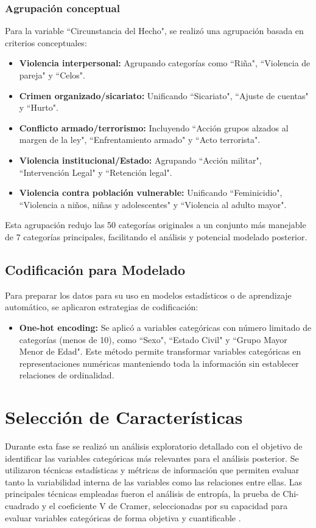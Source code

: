 \documentclass[lettersize,journal]{IEEEtran}
\begin{document}
\subsubsection{Agrupación conceptual}
Para la variable ``Circunstancia del Hecho", se realizó una agrupación basada en criterios conceptuales:
\begin{itemize}
\item \textbf{Violencia interpersonal:} Agrupando categorías como ``Riña", ``Violencia de pareja" y ``Celos".
\item \textbf{Crimen organizado/sicariato:} Unificando ``Sicariato", ``Ajuste de cuentas" y ``Hurto".

\item \textbf{Conflicto armado/terrorismo:} Incluyendo ``Acción grupos alzados al margen de la ley", ``Enfrentamiento armado" y ``Acto terrorista".

\item \textbf{Violencia institucional/Estado:} Agrupando ``Acción militar", ``Intervención Legal" y ``Retención legal".

\item \textbf{Violencia contra población vulnerable:} Unificando ``Feminicidio", ``Violencia a niños, niñas y adolescentes" y ``Violencia al adulto mayor".
\end{itemize}
Esta agrupación redujo las 50 categorías originales a un conjunto más manejable de 7 categorías principales, facilitando el análisis y potencial modelado posterior.
\subsection{Codificación para Modelado}
Para preparar los datos para su uso en modelos estadísticos o de aprendizaje automático, se aplicaron estrategias de codificación:
\begin{itemize}
\item \textbf{One-hot encoding:} Se aplicó a variables categóricas con número limitado de categorías (menos de 10), como ``Sexo", ``Estado Civil" y ``Grupo Mayor Menor de Edad". Este método permite transformar variables categóricas en representaciones numéricas manteniendo toda la información sin establecer relaciones de ordinalidad.
\end{itemize}
\section{Selección de Características}

Durante esta fase se realizó un análisis exploratorio detallado con el objetivo de identificar las variables categóricas más relevantes para el análisis posterior. Se utilizaron técnicas estadísticas y métricas de información que permiten evaluar tanto la variabilidad interna de las variables como las relaciones entre ellas. Las principales técnicas empleadas fueron el análisis de entropía, la prueba de Chi-cuadrado y el coeficiente V de Cramer, seleccionadas por su capacidad para evaluar variables categóricas de forma objetiva y cuantificable \cite{tan2018introduction}.
\end{document}
